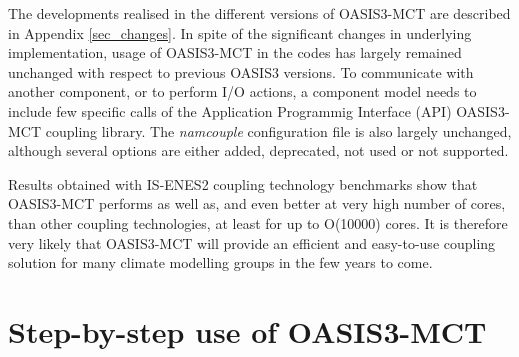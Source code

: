 The developments realised in the different versions of OASIS3-MCT are described in Appendix \ref{sec_changes}.   
In spite of the significant changes in underlying implementation,
usage of OASIS3-MCT in the codes has largely remained unchanged with
respect to previous OASIS3 versions.
To communicate with another component, or to perform I/O actions, a
component model needs to include few specific calls of the Application Programmig Interface (API)  OASIS3-MCT coupling library.  The {\it namcouple} configuration file is also largely unchanged, although several options are either added, deprecated, not used
or not supported. 

Results obtained with IS-ENES2 coupling technology benchmarks show that OASIS3-MCT performs as well as, and even better at very high number of cores, than other coupling technologies, at least for up to O(10000) cores. It is therefore very likely that OASIS3-MCT will provide an efficient and
easy-to-use coupling solution for many climate modelling groups in the few years to come. 


\section{Step-by-step use of OASIS3-MCT}

